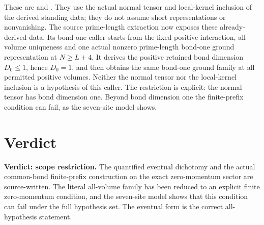 \documentclass{article}
\begin{document}
These are
and
.
They use the actual normal tensor and local-kernel inclusion of the derived
standing data; they do not assume short representations or nonvanishing.
The source prime-length extraction now exposes these already-derived data.
Its bond-one caller
starts from the fixed positive interaction, all-volume uniqueness and one
actual nonzero prime-length bond-one ground representation at $N\geq L+4$.
It derives the positive retained bond dimension $D_0\leq1$, hence $D_0=1$,
and then obtains the same bond-one ground family at all permitted positive
volumes. Neither the normal tensor nor the local-kernel inclusion is a
hypothesis of this caller.
The restriction is explicit: the normal tensor has bond dimension one.
Beyond bond dimension one the finite-prefix condition can fail, as the
seven-site model shows.

\section{Verdict}

\textbf{Verdict: scope restriction.} The quantified eventual dichotomy
and the actual common-bond finite-prefix construction on the exact
zero-momentum sector are source-written. The literal all-volume family
has been reduced to an explicit finite zero-momentum condition, and the
seven-site model shows that this condition can fail under the full
hypothesis set. The eventual form is the correct all-hypothesis statement.



\end{document}
